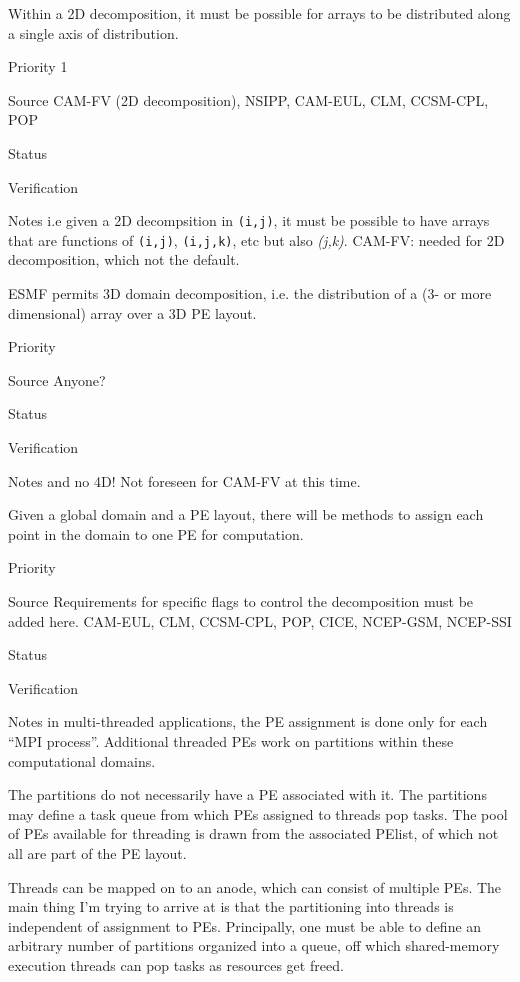 Within a 2D decomposition, it must be possible for arrays to be
distributed along a single axis of distribution.

\begin{reqlist}
\item[Priority] 1
\item[Source] CAM-FV (2D decomposition), NSIPP, CAM-EUL, CLM, CCSM-CPL, POP \\
\item[Status]
\item[Verification]
\item[Notes] i.e given a 2D decompsition in \texttt{(i,j)}, it must be
  possible to have arrays that are functions of \texttt{(i,j)},
  \texttt{(i,j,k)}, etc but also \emph{(j,k)}.  CAM-FV: needed for
  2D decomposition, which not the default.
\end{reqlist}


ESMF permits 3D domain decomposition, i.e. the distribution of a
(3- or more dimensional) array over a 3D PE layout.

\begin{reqlist}
\item[Priority]
\item[Source] Anyone?
\item[Status]
\item[Verification]
\item[Notes] and no 4D!    Not foreseen for CAM-FV at this time.
\end{reqlist}


Given a global domain and a PE layout, there will be methods to assign
each point in the domain to one PE for computation. 

\begin{reqlist}
\item[Priority] 
\item[Source] Requirements for specific flags to control the
  decomposition must be added here. CAM-EUL, CLM, CCSM-CPL, POP, CICE, NCEP-GSM, NCEP-SSI
\item[Status]
\item[Verification]
\item[Notes] in multi-threaded applications, the PE assignment is done
  only for each ``MPI process''. Additional threaded PEs work on
  partitions within these computational domains.
  
  The partitions do not necessarily have a PE associated with it. The
  partitions may define a task queue from which PEs assigned to
  threads pop tasks. The pool of PEs available for threading is drawn
  from the associated PElist, of which not all are part of the PE
  layout.
  
  Threads can be mapped on to an anode, which can consist of multiple
  PEs.  The main thing I'm trying to arrive at is that the
  partitioning into threads is independent of assignment to PEs.
  Principally, one must be able to define an arbitrary number of
  partitions organized into a queue, off which shared-memory execution
  threads can pop tasks as resources get freed.
\end{reqlist}

